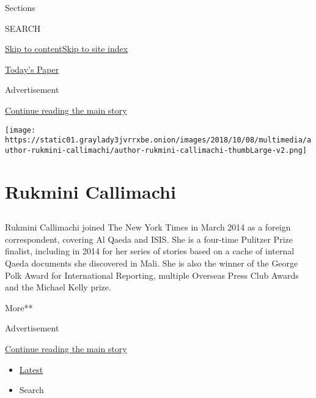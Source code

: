 Sections

SEARCH

\protect\hyperlink{site-content}{Skip to
content}\protect\hyperlink{site-index}{Skip to site index}

\href{https://myaccount.nytimes3xbfgragh.onion/auth/login?response_type=cookie\&client_id=vi}{}

\href{https://www.nytimes3xbfgragh.onion/section/todayspaper}{Today's
Paper}

Advertisement

\protect\hyperlink{after-top}{Continue reading the main story}

\texttt{[image: https://static01.graylady3jvrrxbe.onion/images/2018/10/08/multimedia/author-rukmini-callimachi/author-rukmini-callimachi-thumbLarge-v2.png]}

\hypertarget{rukmini-callimachi}{%
\section{Rukmini Callimachi}\label{rukmini-callimachi}}

\subsection{}

Rukmini Callimachi joined The New York Times in March 2014 as a foreign
correspondent, covering Al Qaeda and ISIS. She is a four-time Pulitzer
Prize finalist, including in 2014 for her series of stories based on a
cache of internal Qaeda documents she discovered in Mali. She is also
the winner of the George Polk Award for International Reporting,
multiple Overseas Press Club Awards and the Michael Kelly prize.

More**

Advertisement

\protect\hyperlink{after-mid1}{Continue reading the main story}

\begin{itemize}
\tightlist
\item
  \protect\hyperlink{stream-panel}{Latest}
\item
  Search
\end{itemize}

